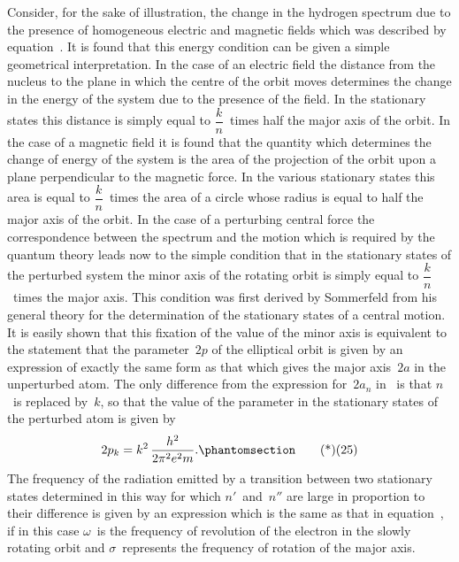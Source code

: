 Consider, for the sake of illustration, the change in the hydrogen
spectrum due to the presence of homogeneous electric and magnetic
fields which was described by equation~. It is found that
this energy condition can be given a simple geometrical interpretation.
In the case of an electric field the distance from the
nucleus to the plane in which the centre of the orbit moves determines
the change in the energy of the system due to the presence
of the field. In the stationary states this distance is simply equal
to $\dfrac{k}{n}$~times half the major axis of the orbit. In the case of a magnetic
field it is found that the quantity which determines the change
of energy of the system is the area of the projection of the orbit
upon a plane perpendicular to the magnetic force. In the various
stationary states this area is equal to $\dfrac{k}{n}$~times the area of a circle
whose radius is equal to half the major axis of the orbit. In the
case of a perturbing central force the correspondence between
the spectrum and the motion which is required by the quantum
theory leads now to the simple condition that in the stationary
states of the perturbed system the minor axis of the rotating orbit
is simply equal to $\dfrac{k}{n}$~times the major axis. This condition was first
derived by Sommerfeld from his general theory for the determination
of the stationary states of a central motion. It is easily shown
that this fixation of the value of the minor axis is equivalent to
the statement that the parameter~$2p$ of the elliptical orbit is given
by an expression of exactly the same form as that which gives the
major axis~$2a$ in the unperturbed atom. The only difference from
the expression for~$2a_{n}$ in~ is that $n$~is replaced by~$k$, so that
the value of the parameter in the stationary states of the perturbed
atom is given by
\[
2p_{k} = k^{2}\, \frac{h^{2}}{2\pi^{2} e^{2} m}.
\Tag{(25)}
\]
The frequency of the radiation emitted by a transition between
two stationary states determined in this way for which $n'$~and~$n''$ are
large in proportion to their difference is given by an expression
which is the same as that in equation~, if in this case $\omega$~is the
frequency of revolution of the electron in the slowly rotating orbit
and $\sigma$~represents the frequency of rotation of the major axis.

